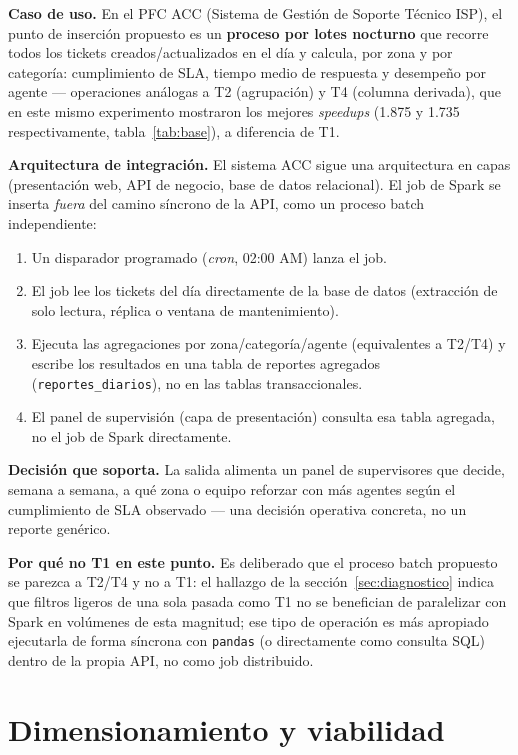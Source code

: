 \documentclass[11pt,a4paper]{article}
\begin{document}
\textbf{Caso de uso.} En el PFC ACC (Sistema de Gestión de Soporte Técnico ISP), el
punto de inserción propuesto es un \textbf{proceso por lotes nocturno} que recorre
todos los tickets creados/actualizados en el día y calcula, por zona y por
categoría: cumplimiento de SLA, tiempo medio de respuesta y desempeño por agente
--- operaciones análogas a T2 (agrupación) y T4 (columna derivada), que en este
mismo experimento mostraron los mejores \textit{speedups} (1.875 y 1.735
respectivamente, tabla~\ref{tab:base}), a diferencia de T1.

\textbf{Arquitectura de integración.} El sistema ACC sigue una arquitectura en
capas (presentación web, API de negocio, base de datos relacional). El job de
Spark se inserta \emph{fuera} del camino síncrono de la API, como un proceso batch
independiente:
\begin{enumerate}
  \item Un disparador programado (\textit{cron}, 02:00 AM) lanza el job.
  \item El job lee los tickets del día directamente de la base de datos
    (extracción de solo lectura, réplica o ventana de mantenimiento).
  \item Ejecuta las agregaciones por zona/categoría/agente (equivalentes a
    T2/T4) y escribe los resultados en una tabla de reportes agregados
    (\texttt{reportes\_diarios}), no en las tablas transaccionales.
  \item El panel de supervisión (capa de presentación) consulta esa tabla
    agregada, no el job de Spark directamente.
\end{enumerate}

\textbf{Decisión que soporta.} La salida alimenta un panel de supervisores que
decide, semana a semana, a qué zona o equipo reforzar con más agentes según el
cumplimiento de SLA observado --- una decisión operativa concreta, no un reporte
genérico.

\textbf{Por qué no T1 en este punto.} Es deliberado que el proceso batch propuesto
se parezca a T2/T4 y no a T1: el hallazgo de la sección~\ref{sec:diagnostico}
indica que filtros ligeros de una sola pasada como T1 no se benefician de
paralelizar con Spark en volúmenes de esta magnitud; ese tipo de operación es más
apropiado ejecutarla de forma síncrona con \texttt{pandas} (o directamente como
consulta SQL) dentro de la propia API, no como job distribuido.

\section{Dimensionamiento y viabilidad}
\end{document}
